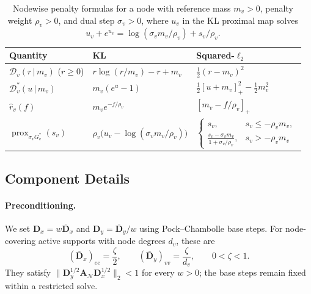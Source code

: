 \begin{table}[t]
\centering
\caption{Nodewise penalty formulas for a node with reference mass $m_v>0$, penalty weight $\rho_v>0$, and dual step $\sigma_v>0$, where $u_v$ in the KL proximal map solves $u_v+e^{u_v}=\log(\sigma_v m_v/\rho_v)+s_v/\rho_v$.}
\label{tab:penalty-formulas}
\footnotesize
\begin{tabular}{lll}
\toprule
Quantity & KL & Squared-$\ell_2$ \\
\midrule
$\mathcal{D}_v(r\,|\,m_v)$ ($r\geq0$) & $r\log(r/m_v)-r+m_v$ & $\frac{1}{2}(r-m_v)^2$ \\[4pt]
$\mathcal{D}_v^*(u\,|\,m_v)$ & $m_v(e^{u}-1)$ & $\frac{1}{2}[u+m_v]_+^2-\frac{1}{2}m_v^2$ \\[4pt]
$\widehat{r}_v(f)$ & $m_v e^{-f/\rho_v}$ & $[m_v-f/\rho_v]_+$ \\[4pt]
$\operatorname{prox}_{\sigma_v G_v^*}(s_v)$ & $\rho_v\bigl(u_v-\log(\sigma_v m_v/\rho_v)\bigr)$ & $\begin{cases}s_v,& s_v\leq-\rho_v m_v,\\ \frac{s_v-\sigma_v m_v}{1+\sigma_v/\rho_v},& s_v>-\rho_v m_v\end{cases}$ \\
\bottomrule
\end{tabular}
\end{table}

\subsection{\subsolver Component Details}
\label{app:pduot-controls}
\paragraph{Preconditioning.}
We set $\mathbf D_x=w\overline{\mathbf D}_x$ and $\mathbf D_y=\overline{\mathbf D}_y/w$ using Pock--Chambolle base steps.
For node-covering active supports with node degrees $d_v$, these are
\begin{equation}
\label{eq:pduot-metric}
(\overline{\mathbf D}_x)_{ee}=\frac{\zeta}{2},\qquad (\overline{\mathbf D}_y)_{vv}=\frac{\zeta}{d_v},\qquad 0<\zeta<1.
\end{equation}
They satisfy $\|\mathbf D_y^{1/2}\mathbf A_{\mathcal N}\mathbf D_x^{1/2}\|_2<1$ for every $w>0$; the base steps remain fixed within a restricted solve.

